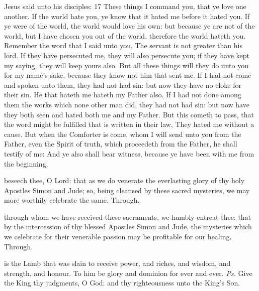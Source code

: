  Jesus said unto his disciples: 17 These things I command you, that ye love one another. If the world hate you, ye know that it hated me before it hated you. If ye were of the world, the world would love his own: but because ye are not of the world, but I have chosen you out of the world, therefore the world hateth you. Remember the word that I said unto you, The servant is not greater than his lord. If they have persecuted me, they will also persecute you; if they have kept my saying, they will keep yours also. But all these things will they do unto you for my name's sake, because they know not him that sent me. If I had not come and spoken unto them, they had not had sin: but now they have no cloke for their sin. He that hateth me hateth my Father also. If I had not done among them the works which none other man did, they had not had sin: but now have they both seen and hated both me and my Father. But this cometh to pass, that the word might be fulfilled that is written in their law, They hated me without a cause. But when the Comforter is come, whom I will send unto you from the Father, even the Spirit of truth, which proceedeth from the Father, he shall testify of me: And ye also shall bear witness, because ye have been with me from the beginning.


\secret
{} beseech thee, O Lord: that as we do venerate the everlasting glory of thy holy Apostles Simon and Jude; so, being cleansed by these sacred mysteries, we may more worthily celebrate the same. Through.


\postcommunion
{} through whom we have received these sacraments, we humbly entreat thee: that by the intercession of thy blessed Apostles Simon and Jude, the mysteries which we celebrate for their venerable passion may be profitable for our healing. Through.


\fancyhead[RE,LO]{}

\introit
{} is the Lamb that was slain to receive power, and riches, and wisdom, and strength, and honour. To him be glory and dominion for ever and ever. \textit{Ps.} Give the King thy judgments, O God: and thy righteousness unto the King's Son.


